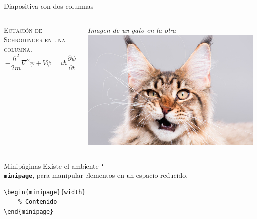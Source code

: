 \documentclass{beamer}
\newcommand{\bftt}[1]{\textbf{\texttt{#1}}}
\newcommand{\cmd}[1]{{\color{mygreen}\bftt{#1}}}
\newcommand{\bs}{\char`\\}
\newcommand{\cmdbs}[1]{\cmd{\bs#1}}
\begin{document}
    \begin{frame}{Diapositiva con dos columnas}
        \begin{columns}[totalwidth=\textwidth]
            \begin{column}[t]{0.5\textwidth}
            \centering
            \textsc{Ecuación de Schrödinger en una columna}.
            \vspace{0.5cm}
            \begin{equation*}
                -\frac{\hbar^2}{2m}\nabla^2\psi + V\psi =  i\hbar\frac{\partial \psi}{\partial t}
            \end{equation*}
            \end{column}
            \vrule{}
            \begin{column}[t]{0.5\textwidth}
                \centering
                \emph{\textrm{Imagen de un gato en la otra}}\\ [2ex]
                \centering
                \includegraphics[width=0.8\linewidth]{gato.jpeg}
            \end{column}
        \end{columns}        
    \end{frame}

    \begin{frame}[fragile]{Minipáginas}
        Existe el ambiente \cmdbs{minipage}, para manipular
        elementos en un espacio reducido. \\ [3ex]
        \begin{center}
            \begin{minipage}{0.45\textwidth}        
                \begin{verbatim}
\begin{minipage}{width}
    % Contenido
\end{minipage}
                \end{verbatim}
            \end{minipage}
        \end{center}
    \end{frame}
\end{document}
